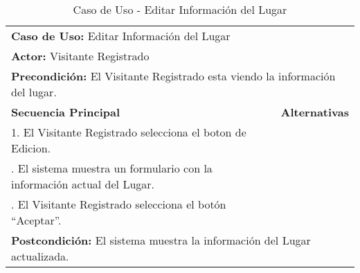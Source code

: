 \begin{table}[H]
  \begin{center}
    \begin{tabularx}{0.75\textwidth}{ X X  }
      \toprule
      \multicolumn{2}{l}{\textbf{Caso de Uso:} Editar Información del Lugar} \\
      \multicolumn{2}{l}{\textbf{Actor:} Visitante Registrado} \\
      \multicolumn{2}{L{12cm}}{\textbf{Precondición:} El Visitante Registrado esta viendo la información del lugar.} \\
      \addlinespace
      \textbf{Secuencia Principal} & \textbf{Alternativas} \\
      \midrule
      1. El Visitante Registrado selecciona el boton de Edicion. \\
      \addlinespace
      2. El sistema muestra un formulario con la información actual del Lugar.& \\
      \addlinespace
      3. El Visitante Registrado selecciona el botón ``Aceptar''. & \\


      \midrule
      \multicolumn{2}{L{11cm}}{\textbf{Postcondición:} El sistema muestra la información del Lugar actualizada.} \\

      \bottomrule
    \end{tabularx}
    \caption{Caso de Uso - Editar Información del Lugar}
    \label{tab:cu_edit_place}
  \end{center}
\end{table}



